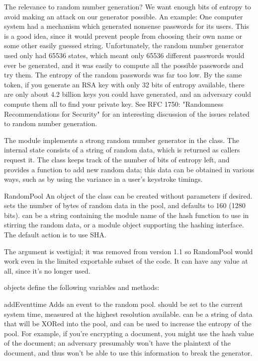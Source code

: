 \documentclass{howto}
\begin{document}
The relevance to random number generation?  We want enough bits of
entropy to avoid making an attack on our generator possible.  An
example: One computer system had a mechanism which generated nonsense
passwords for its users.  This is a good idea, since it would prevent
people from choosing their own name or some other easily guessed string.
Unfortunately, the random number generator used only had 65536 states,
which meant only 65536 different passwords would ever be generated, and
it was easily to compute all the possible passwords and try them.  The
entropy of the random passwords was far too low.  By the same token, if
you generate an RSA key with only 32 bits of entropy available, there
are only about 4.2 billion keys you could have generated, and an
adversary could compute them all to find your private key.  See RFC 1750:
"Randomness Recommendations for Security" for an interesting discussion
of the issues related to random number generation.

The  module implements a strong random number generator
in the  class.  The internal state consists of a string
of random data, which is returned as callers request it.  The class
keeps track of the number of bits of entropy left, and provides a function to
add new random data; this data can be obtained in various ways, such as
by using the variance in a user's keystroke timings.  

\begin{funcdesc}{RandomPool}{ }
An object of the  class can be created without
parameters if desired.   sets the number of bytes of
random data in the pool, and defaults to 160 (1280 bits). 
can be a string containing the module name of the hash function to use
in stirring the random data, or a module object supporting the hashing
interface.  The default action is to use SHA.

The  argument is vestigial; it was removed from version
1.1 so RandomPool would work even in the limited exportable subset of
the code.  It can have any value at all, since it's no longer used.

\end{funcdesc}

 objects define the following variables and methods:

\begin{funcdesc}{addEvent}{time}
Adds an event to the random pool.   should be set to the
current system time, measured at the highest resolution available.
 can be a string of data that will be XORed into the pool,
and can be used to increase the entropy of the pool.  For example, if
you're encrypting a document, you might use the hash value of the
document; an adversary presumably won't have the plaintext of the
document, and thus won't be able to use this information to break the
generator.
\end{funcdesc}
\end{document}
